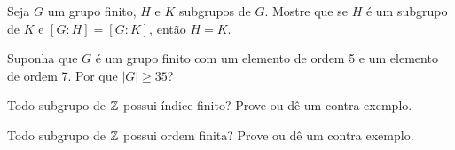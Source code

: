 \documentclass[12pt]{exam}
\begin{document}
    \vspace{.3cm}

    \questao{} Seja $G$ um grupo finito, $H$ e $K$ subgrupos de $G$. Mostre que se $H$ é um subgrupo de $K$ e $[G : H ] = [G : K]$, então $H = K$.

    \vspace{.3cm}

    \questao{} Suponha que $G$ é um grupo finito com um elemento de ordem 5 e um elemento de ordem 7. Por que $|G| \ge 35$?

    \vspace{.3cm}

    \questao{} Todo subgrupo de $\mathbb{Z}$ possui índice finito? Prove ou dê um contra exemplo.

    \vspace{.3cm}

    \questao{} Todo subgrupo de $\mathbb{Z}$ possui ordem finita? Prove ou dê um contra exemplo.
\end{document}
